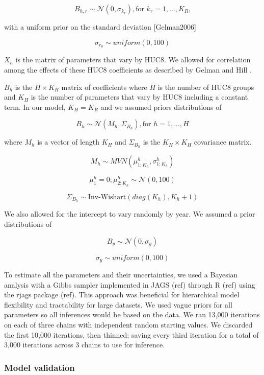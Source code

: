 \documentclass[]{article}
\begin{document}
\[ B_{h,r} \sim \mathcal{N}(0,\sigma_{k_{r}}), \text{for $k_{r} = 1,...,K_{R}$,} \]

with a uniform prior on the standard deviation {[}Gelman2006{]}

\[ \sigma_{r_0} \sim uniform(0,100) \]

\(X_{h}\) is the matrix of parameters that vary by HUC8. We allowed for
correlation among the effects of these HUC8 coefficients as described by
Gelman and Hill \citeyearpar{Gelman2007}.

\(B_{h}\) is the \(H \times K_{H}\) matrix of coefficients where \(H\)
is the number of HUC8 groups and \(K_H\) is the number of parameters
that vary by HUC8 including a constant term. In our model,
\(K_{H} = K_{R}\) and we assumed priors distributions of

\[ B_{h} \sim \mathcal{N}(M_{h},\Sigma_{B_{h}}), \text{for $h = 1,...,H$} \]

where \(M_{h}\) is a vector of length \(K_{H}\) and \(\Sigma_{B_{h}}\)
is the \(K_{H} \times K_{H}\) covariance matrix.

\[ M_{h} \sim MVN(\mu_{1:K_h}^h, \sigma_{1:K_h}^h) \]

\[ \mu_{1}^h = 0; \mu_{2:K_h}^h \sim \mathcal{N}(0, 100) \]

\[ \Sigma_{B_{h}} \sim \text{Inv-Wishart}(diag(K_{h}), K_{h}+1) \]

We also allowed for the intercept to vary randomly by year. We assumed a
prior distributions of

\[ B_{y} \sim \mathcal{N}(0,\sigma_{y}) \]

\[ \sigma_{y} \sim uniform(0,100) \]

To estimate all the parameters and their uncertainties, we used a
Bayesian analysis with a Gibbs sampler implemented in JAGS (ref) through
R (ref) using the rjags package (ref). This approach was beneficial for
hierarchical model flexibility and tractability for large datasets. We
used vague priors for all parameters so all inferences would be based on
the data. We ran 13,000 iterations on each of three chains with
independent random starting values. We discarded the first 10,000
iterations, then thinned; saving every third iteration for a total of
3,000 iterations across 3 chains to use for inference.

\subsubsection{Model validation}\label{model-validation}
\end{document}
